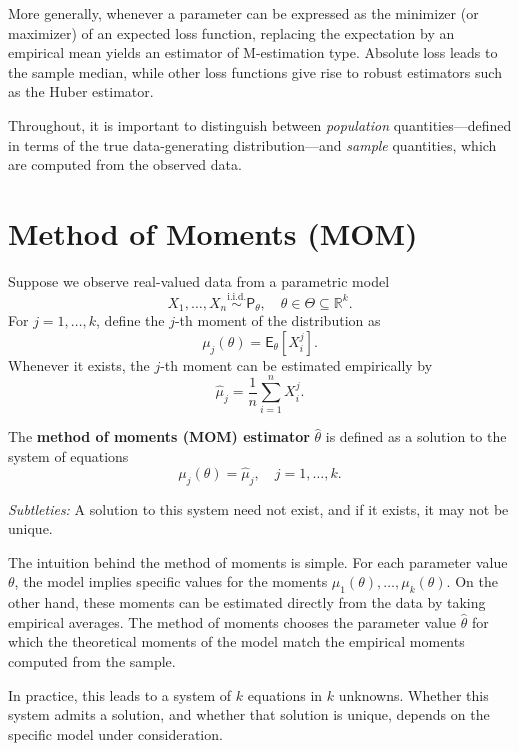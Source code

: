More generally, whenever a parameter can be expressed as the minimizer (or
maximizer) of an expected loss function, replacing the expectation by an
empirical mean yields an estimator of M-estimation type. Absolute loss leads to
the sample median, while other loss functions give rise to robust estimators
such as the Huber estimator.

Throughout, it is important to distinguish between \emph{population}
quantities—defined in terms of the true data-generating distribution—and
\emph{sample} quantities, which are computed from the observed data.

\section{Method of Moments (MOM)}
\label{sec:mom}

Suppose we observe real-valued data from a parametric model
\[
X_1, \dots, X_n \overset{\text{i.i.d.}}{\sim} \mathsf{P}_\theta,
\quad \theta \in \Theta \subseteq \mathbb{R}^k.
\]
For \(j = 1, \dots, k\), define the \(j\)-th moment of the distribution as
\[
\mu_j(\theta) = \mathsf{E}_\theta[X_i^j].
\]
Whenever it exists, the \(j\)-th moment can be estimated empirically by
\[
\hat\mu_j = \frac{1}{n} \sum_{i=1}^n X_i^j.
\]

\begin{definition}
The \textbf{method of moments (MOM) estimator} \(\hat\theta\) is defined as a
solution to the system of equations
\[
\mu_j(\theta) = \hat\mu_j, \quad j = 1, \dots, k.
\]
\end{definition}

\emph{Subtleties:} A solution to this system need not exist, and if it exists,
it may not be unique.

The intuition behind the method of moments is simple. For each parameter value
\(\theta\), the model implies specific values for the moments
\(\mu_1(\theta), \dots, \mu_k(\theta)\). On the other hand, these moments can be
estimated directly from the data by taking empirical averages. The method of
moments chooses the parameter value \(\hat\theta\) for which the theoretical
moments of the model match the empirical moments computed from the sample.

In practice, this leads to a system of \(k\) equations in \(k\) unknowns. Whether
this system admits a solution, and whether that solution is unique, depends on
the specific model under consideration.


